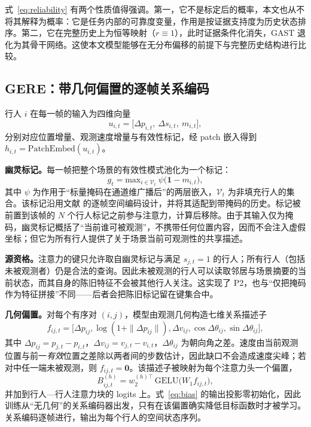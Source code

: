 式~\eqref{eq:reliability} 有两个性质值得强调。第一，它不是标定后的概率，本文也从不将其解释为概率：它是任务内部的可靠度变量，作用是按证据支持度为历史状态排序。第二，它在完整历史上为恒等映射（$r\equiv1$），此时证据条件化消失，GAST 退化为其骨干网络。这使本文模型能够在无分布偏移的前提下与完整历史结构进行比较。

\subsection{GERE：带几何偏置的逐帧关系编码}
\label{sec:gere}

行人 $i$ 在每一帧的输入为四维向量
\begin{equation}
u_{i,t}=\big[\Delta p_{i,t},\ \Delta s_{i,t},\ m_{i,t}\big],
\label{eq:input}
\end{equation}
分别对应位置增量、观测速度增量与有效性标记，经 patch 嵌入得到 $h_{i,t}=\mathrm{PatchEmbed}(u_{i,t})$。

\textbf{幽灵标记。}每一帧把整个场景的有效性模式池化为一个标记：
\begin{equation}
g_{t}=\mathrm{max}_{i\in\mathcal{V}_{t}}\ \psi\big(\mathbf{1}-m_{i,t}\big),
\label{eq:ghost}
\end{equation}
其中 $\psi$ 为作用于“标量掩码在通道维广播后”的两层嵌入，$\mathcal{V}_{t}$ 为非填充行人的集合。该标记沿用文献 \cite{xu2025sportstraj} 的逐帧空间编码设计，并将其适配到带掩码的历史。标记被前置到该帧的 $N$ 个行人标记之前参与注意力，计算后移除。由于其输入仅为掩码，幽灵标记概括了“当前谁可被观测”，不携带任何位置内容，因而不会注入虚假坐标；但它为所有行人提供了关于场景当前可观测性的共享描述。

\textbf{源资格。}注意力的键只允许取自幽灵标记与满足 $s_{j,t}=1$ 的行人；所有行人（包括未被观测者）仍是合法的查询。因此未被观测的行人可以读取邻居与场景摘要的当前状态，而其自身的陈旧特征不会被其他行人关注。这实现了 P2，也与“仅把掩码作为特征拼接”不同——后者会把陈旧标记留在键集合中。

\textbf{几何偏置。}对每个有序对 $(i,j)$，模型由观测几何构造七维关系描述子
\begin{equation}
f_{ij,t}=\big[\Delta p_{ij},\log(1+\|\Delta p_{ij}\|),\Delta v_{ij},\cos\Delta\theta_{ij},\sin\Delta\theta_{ij}\big],
\label{eq:geom}
\end{equation}
其中 $\Delta p_{ij}=p_{j,t}-p_{i,t}$，$\Delta v_{ij}=v_{j,t}-v_{i,t}$，$\Delta\theta_{ij}$ 为朝向角之差。速度由当前观测位置与前一\emph{有效}位置之差除以两者间的步数估计，因此缺口不会造成速度尖峰；若对中任一端未被观测，则 $f_{ij,t}=\mathbf{0}$。该描述子被映射为每个注意力头一个偏置，
\begin{equation}
B_{ij,t}^{(h)}=w_{2}^{(h)\top}\,\mathrm{GELU}\big(W_{1}f_{ij,t}\big),
\label{eq:bias}
\end{equation}
并加到行人—行人注意力块的 logits 上。式~\eqref{eq:bias} 的输出投影零初始化，因此训练从“无几何”的关系编码器出发，只有在该偏置确实降低目标函数时才被学习。关系编码逐帧进行，输出为每个行人的空间状态序列。

